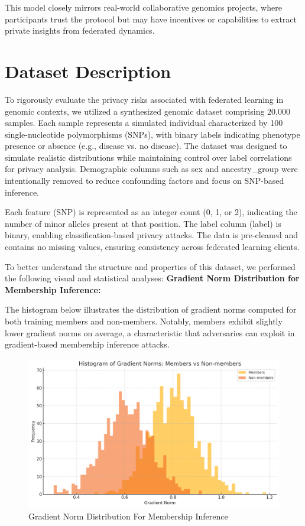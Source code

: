 \documentclass[conference]{IEEEtran}
\begin{document}
This model closely mirrors real-world collaborative genomics projects, where participants trust the protocol but may have incentives or capabilities to extract private insights from federated dynamics.

\section{Dataset Description}

To rigorously evaluate the privacy risks associated with federated learning in genomic contexts, we utilized a synthesized genomic dataset comprising 20,000 samples. Each sample represents a simulated individual characterized by 100 single-nucleotide polymorphisms (SNPs), with binary labels indicating phenotype presence or absence (e.g., disease vs. no disease). The dataset was designed to simulate realistic distributions while maintaining control over label correlations for privacy analysis. Demographic columns such as sex and ancestry\_group were intentionally removed to reduce confounding factors and focus on SNP-based inference.

Each feature (SNP) is represented as an integer count (0, 1, or 2), indicating the number of minor alleles present at that position. The label column (label) is binary, enabling classification-based privacy attacks. The data is pre-cleaned and contains no missing values, ensuring consistency across federated learning clients.

To better understand the structure and properties of this dataset, we performed the following visual and statistical analyses:
\newline
\newline
\textbf{Gradient Norm Distribution for Membership Inference:}

\par The histogram below illustrates the distribution of gradient norms computed for both training members and non-members. Notably, members exhibit slightly lower gradient norms on average, a characteristic that adversaries can exploit in gradient-based membership inference attacks.

\begin{figure}[H]
    \centering
    \includegraphics[width=\linewidth]{Histogram_of_Gradient_Norms.png}
    \caption{Gradient Norm Distribution For Membership Inference}
\end{figure}
\end{document}
